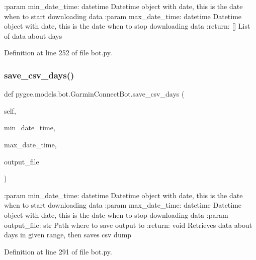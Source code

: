 \begin{DoxyVerb}:param min_date_time: datetime
    Datetime object with date, this is the date when to start downloading data
:param max_date_time: datetime
    Datetime object with date, this is the date when to stop downloading data
:return: []
    List of data about days
\end{DoxyVerb}
 

Definition at line 252 of file bot.\+py.

\mbox{\label{classpygce_1_1models_1_1bot_1_1_garmin_connect_bot_ac10284acc765724afd060381ace0cb5e}} 
\subsubsection{\texorpdfstring{save\+\_\+csv\+\_\+days()}{save\_csv\_days()}}
{\footnotesize\ttfamily def pygce.\+models.\+bot.\+Garmin\+Connect\+Bot.\+save\+\_\+csv\+\_\+days (\begin{DoxyParamCaption}\item[{}]{self,  }\item[{}]{min\+\_\+date\+\_\+time,  }\item[{}]{max\+\_\+date\+\_\+time,  }\item[{}]{output\+\_\+file }\end{DoxyParamCaption})}

\begin{DoxyVerb}:param min_date_time: datetime
    Datetime object with date, this is the date when to start downloading data
:param max_date_time: datetime
    Datetime object with date, this is the date when to stop downloading data
:param output_file: str
    Path where to save output to
:return: void
    Retrieves data about days in given range, then saves csv dump
\end{DoxyVerb}
 

Definition at line 291 of file bot.\+py.

\mbox{\label{classpygce_1_1models_1_1bot_1_1_garmin_connect_bot_a9cd831d6a4a8efdd793a395f99fc1796}} 
